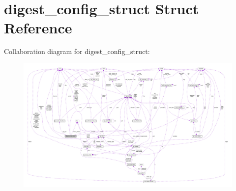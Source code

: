 \hypertarget{structdigest__config__struct}{}\section{digest\+\_\+config\+\_\+struct Struct Reference}
\label{structdigest__config__struct}


Collaboration diagram for digest\+\_\+config\+\_\+struct\+:
\nopagebreak
\begin{figure}[H]
\begin{center}
\leavevmode
\includegraphics[width=350pt]{structdigest__config__struct__coll__graph}
\end{center}
\end{figure}

